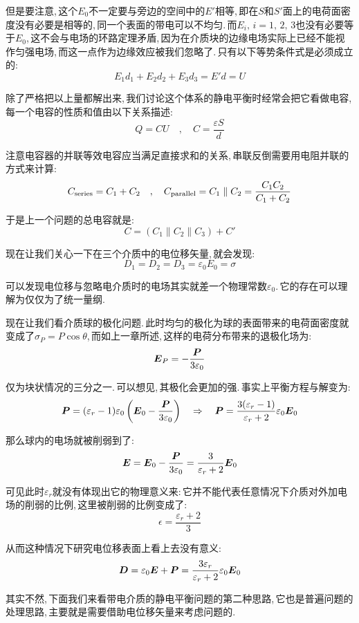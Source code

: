 但是要注意,\,这个$E_0$不一定要与旁边的空间中的$E'$相等,\,即在$S$和$S'$面上的电荷面密度没有必要是相等的,\,同一个表面的带电可以不均匀.\,而$E_i,\,i=1,\,2,\,3$也没有必要等于$E_0$,\,这不会与电场的环路定理矛盾,\,因为在介质块的边缘电场实际上已经不能视作匀强电场,\,而这一点作为边缘效应被我们忽略了.\,只有以下等势条件式是必须成立的:
\[E_1d_1+E_2d_2+E_3d_3=E'd=U\]

除了严格把以上量都解出来,\,我们讨论这个体系的静电平衡时经常会把它看做电容,\,每一个电容的性质和值由以下关系描述:
\[Q=CU\quad ,\quad C=\frac{\varepsilon S}{d}\]

注意电容器的并联等效电容应当满足直接求和的关系,\,串联反倒需要用电阻并联的方式来计算:
\[C_{\rm series}=C_1+C_2\quad ,\quad C_{\rm parallel}=C_1\parallel C_2=\frac{C_1C_2}{C_1+C_2}\]

于是上一个问题的总电容就是:
\[C=(C_1\parallel C_2\parallel C_3)+C'\]

现在让我们关心一下在三个介质中的电位移矢量,\,就会发现:
\[D_1=D_2=D_3=\varepsilon_0 E_0=\sigma\]

可以发现电位移与忽略电介质时的电场其实就差一个物理常数$\varepsilon_0$.\,它的存在可以理解为仅仅为了统一量纲.

\vspace{0.8cm}

现在让我们看介质球的极化问题.\,此时均匀的极化为球的表面带来的电荷面密度就变成了$\sigma_P=P\cos\theta$,\,而如上一章所述,\,这样的电荷分布带来的退极化场为:
\[\boldsymbol{E}_P=-\frac{\boldsymbol{P}}{3\varepsilon_0}\]

仅为块状情况的三分之一.\,可以想见,\,其极化会更加的强.\,事实上平衡方程与解变为:
\[\boldsymbol{P}=(\varepsilon_r-1)\varepsilon_0\left( \boldsymbol{E}_0 -\frac{\boldsymbol{P}}{3\varepsilon_0}\right)\quad \Rightarrow \quad \boldsymbol{P}=\frac{3(\varepsilon_r-1)}{\varepsilon_r+2}\varepsilon_0\boldsymbol{E}_0\]

那么球内的电场就被削弱到了:
\[\boldsymbol{E}= \boldsymbol{E}_0 -\frac{\boldsymbol{P}}{3\varepsilon_0}=\frac{3}{\varepsilon_r+2}\boldsymbol{E}_0\]

可见此时$\varepsilon_r$就没有体现出它的物理意义来:\,它并不能代表任意情况下介质对外加电场的削弱的比例,\,这里被削弱的比例变成了:
\[\epsilon=\frac{\varepsilon_r+2}{3}\]

从而这种情况下研究电位移表面上看上去没有意义:
\[\boldsymbol{D}=\varepsilon_0 \boldsymbol{E}+\boldsymbol{P}=\frac{3\varepsilon_r}{\varepsilon_r+2}\varepsilon_0\boldsymbol{E}_0\]

其实不然,\,下面我们来看带电介质的静电平衡问题的第二种思路,\,它也是普遍问题的处理思路,\,主要就是需要借助电位移矢量来考虑问题的.

\vspace{1cm}

